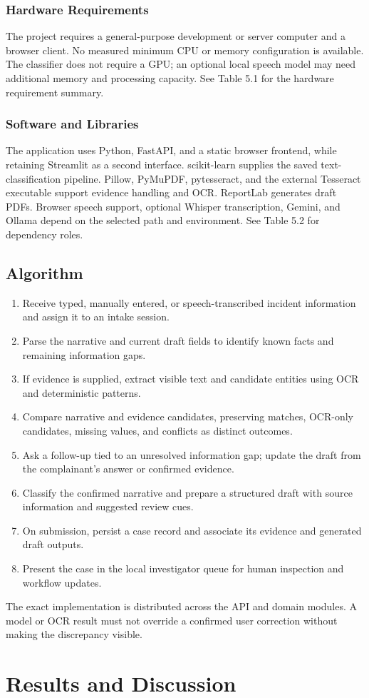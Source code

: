 \documentclass[12pt,a4paper,oneside]{report}
\begin{document}
\subsection{Hardware Requirements}
The project requires a general-purpose development or server computer and a browser client. No measured minimum CPU or memory configuration is available. The classifier does not require a GPU; an optional local speech model may need additional memory and processing capacity. See Table 5.1 for the hardware requirement summary.\par\medskip
\subsection{Software and Libraries}
The application uses Python, FastAPI, and a static browser frontend, while retaining Streamlit as a second interface. scikit-learn supplies the saved text-classification pipeline. Pillow, PyMuPDF, pytesseract, and the external Tesseract executable support evidence handling and OCR. ReportLab generates draft PDFs. Browser speech support, optional Whisper transcription, Gemini, and Ollama depend on the selected path and environment. See Table 5.2 for dependency roles.\par\medskip
\section{Algorithm}
\begin{enumerate}
\item Receive typed, manually entered, or speech-transcribed incident information and assign it to an intake session.
\item Parse the narrative and current draft fields to identify known facts and remaining information gaps.
\item If evidence is supplied, extract visible text and candidate entities using OCR and deterministic patterns.
\item Compare narrative and evidence candidates, preserving matches, OCR-only candidates, missing values, and conflicts as distinct outcomes.
\item Ask a follow-up tied to an unresolved information gap; update the draft from the complainant's answer or confirmed evidence.
\item Classify the confirmed narrative and prepare a structured draft with source information and suggested review cues.
\item On submission, persist a case record and associate its evidence and generated draft outputs.
\item Present the case in the local investigator queue for human inspection and workflow updates.
\end{enumerate}
The exact implementation is distributed across the API and domain modules. A model or OCR result must not override a confirmed user correction without making the discrepancy visible.\par\medskip
\clearpage\chapter{Results and Discussion}
\end{document}
